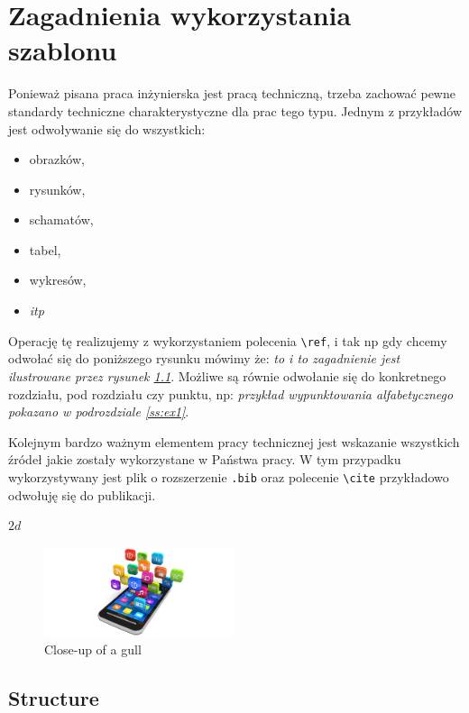 \chapter{Zagadnienia wykorzystania szablonu}
\label{ch:funplenop}

Ponieważ pisana praca inżynierska jest pracą techniczną, trzeba zachować pewne standardy techniczne charakterystyczne dla prac tego typu. Jednym z przykładów jest odwoływanie się do wszystkich:
\begin{itemize}
    \item obrazków,
    \item rysunków,
			    \item schamatów,
			    \item tabel,
			    \item wykresów,
    \item \textit{itp}
\end{itemize}
Operację tę realizujemy z wykorzystaniem polecenia \texttt{\textbackslash ref}, i tak np gdy chcemy odwołać się do poniższego rysunku mówimy że: \textit{to i to zagadnienie jest ilustrowane przez rysunek \ref{fig:mobile}}. Możliwe są równie odwołanie się do konkretnego rozdziału, pod rozdziału czy punktu, np: \textit{ przykład wypunktowania alfabetycznego pokazano w podrozdziale \ref{ss:ex1}}.

Kolejnym bardzo ważnym elementem pracy technicznej jest wskazanie wszystkich źródeł jakie zostały wykorzystane w Państwa pracy. W tym przypadku wykorzystywany jest plik o rozszerzenie \texttt{.bib} oraz polecenie \texttt{\textbackslash cite} przykładowo odwołuję się do publikacji.\cite{Tomaszewski2000}

\(2d\)


\begin{figure}[h!]
  \centering
    \includegraphics[width=0.5\textwidth]{images/mobile-banner}
  \caption{Close-up of a gull}
  \label{fig:mobile}
\end{figure}

\lipsum[1]

\section{Structure}
\lipsum[2]

